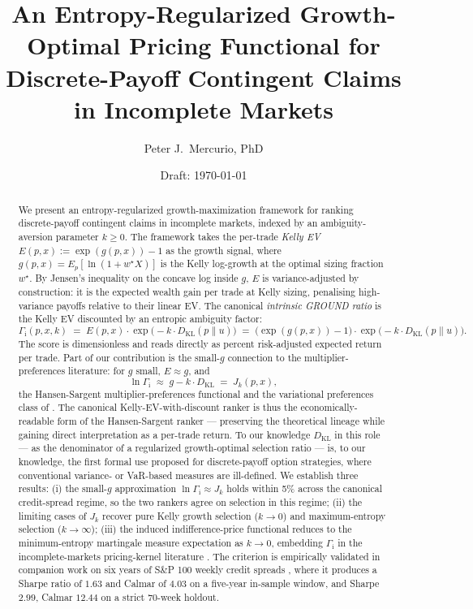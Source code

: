 \documentclass[11pt]{article}
\title{An Entropy-Regularized Growth-Optimal Pricing Functional for \\
       Discrete-Payoff Contingent Claims in Incomplete Markets}
\author{Peter J.~Mercurio, PhD}
\affil{\small \texttt{peter.mercurio@alumni.utoronto.ca}}
\date{Draft: \today}
\theoremstyle{definition}
\theoremstyle{remark}
\newcommand{\KL}{D_{\mathrm{KL}}}
\newcommand{\GROUND}{\Gamma_{\mathrm{i}}}
\begin{document}
\maketitle

\begin{abstract}
We present an entropy-regularized growth-maximization framework for
ranking discrete-payoff contingent claims in incomplete markets,
indexed by an ambiguity-aversion parameter $k \ge 0$. The framework
takes the per-trade \emph{Kelly EV} $E(p, x) := \exp(g(p, x)) - 1$ as
the growth signal, where $g(p, x) = E_p[\ln(1 + w^\star X)]$ is the
Kelly log-growth at the optimal sizing fraction $w^\star$. By Jensen's
inequality on the concave log inside $g$, $E$ is variance-adjusted by
construction: it is the expected wealth gain per trade at Kelly sizing,
penalising high-variance payoffs relative to their linear EV. The
canonical \emph{intrinsic GROUND ratio} is the Kelly EV discounted by
an entropic ambiguity factor:
\begin{equation*}
\GROUND(p, x, k) \;=\; E(p, x) \cdot \exp\!\bigl(-k \cdot \KL(p \| u)\bigr)
\;=\; \bigl(\exp(g(p, x)) - 1\bigr) \cdot \exp\!\bigl(-k \cdot \KL(p \| u)\bigr).
\end{equation*}
The score is dimensionless and reads directly as percent risk-adjusted
expected return per trade. Part of our contribution is the small-$g$
connection to the multiplier-preferences literature: for $g$ small,
$E \approx g$, and
\[
\ln \GROUND \;\approx\; g - k \cdot \KL \;=\; J_k(p, x),
\]
the Hansen-Sargent multiplier-preferences functional
\citep{hansen2008robustness} and the variational preferences class of
\citet{maccheroni2006ambiguity}. The canonical Kelly-EV-with-discount
ranker is thus the economically-readable form of the Hansen-Sargent
ranker --- preserving the theoretical lineage while gaining direct
interpretation as a per-trade return. To our knowledge $\KL$ in this
role --- as the denominator of a regularized growth-optimal selection
ratio --- is, to our knowledge, the first formal use proposed for discrete-payoff
option strategies, where conventional variance- or VaR-based measures
are ill-defined. We establish three results: (i) the small-$g$
approximation $\ln \GROUND \approx J_k$ holds within 5\% across the
canonical credit-spread regime, so the two rankers agree on selection
in this regime; (ii) the limiting cases of $J_k$ recover pure Kelly
growth selection ($k \to 0$) and maximum-entropy selection ($k \to
\infty$); (iii) the induced indifference-price functional reduces to
the minimum-entropy martingale measure expectation as $k \to 0$,
embedding $\GROUND$ in the incomplete-markets pricing-kernel
literature \citep{frittelli2000,follmer2002}. The criterion is
empirically validated in companion work on six years of S\&P 100
weekly credit spreads \citep{mercurio2026empirical}, where it
produces a Sharpe ratio of $1.63$ and Calmar of $4.03$ on a five-year
in-sample window, and Sharpe $2.99$, Calmar $12.44$ on a strict
70-week holdout.
\end{abstract}
\end{document}
